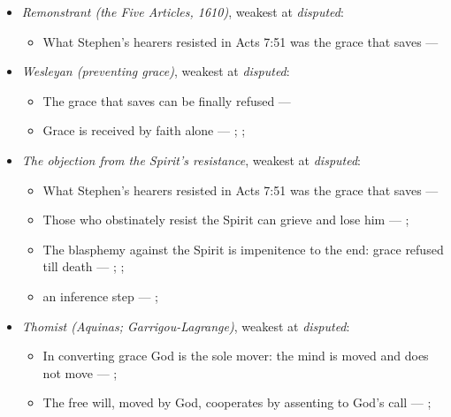 \documentclass[11pt]{article}
\begin{document}
\begin{itemize}
\begin{itemize}
\end{itemize}
\item \emph{Remonstrant (the Five Articles, 1610)}, weakest at \emph{disputed}:
\begin{itemize}
\item What Stephen’s hearers resisted in Acts 7:51 was the grace that saves --- \cite[Five Arminian Articles (1610), art. 4]{schaff-creeds-christendom-3-1977}
\end{itemize}
\item \emph{Wesleyan (preventing grace)}, weakest at \emph{disputed}:
\begin{itemize}
\item The grace that saves can be finally refused --- \cite[397]{wesley-works-9-1827}
\item Grace is received by faith alone --- \cite[Augsburg Confession IV.1–3]{concordia-triglotta-1921}; \cite[Sermon 1, III.1]{wesley-sermons-1872}; \cite[Trent, Session VI (1547), canon 9]{tanner-decrees-1990}
\end{itemize}
\item \emph{The objection from the Spirit’s resistance}, weakest at \emph{disputed}:
\begin{itemize}
\item What Stephen’s hearers resisted in Acts 7:51 was the grace that saves --- \cite[Five Arminian Articles (1610), art. 4]{schaff-creeds-christendom-3-1977}
\item Those who obstinately resist the Spirit can grieve and lose him --- \cite[Solid Declaration II.83]{concordia-triglotta-1921}; \cite[Solid Declaration XI.42]{concordia-triglotta-1921}
\item The blasphemy against the Spirit is impenitence to the end: grace refused till death --- \cite[325]{npnf1-06-1888}; \cite[II-II q.14 a.1]{aquinas-summa-1920}; \cite[74]{calvin-harmony-evangelists-2-1845}
\item an inference step --- \cite[325]{npnf1-06-1888}; \cite[On Rebuke and Grace, ch. 43]{npnf1-05-1887}
\end{itemize}
\item \emph{Thomist (Aquinas; Garrigou-Lagrange)}, weakest at \emph{disputed}:
\begin{itemize}
\item In converting grace God is the sole mover: the mind is moved and does not move --- \cite[I-II q.111 a.2]{aquinas-summa-1920}; \cite[ch. IV]{garrigou-lagrange-grace-1952}
\item The free will, moved by God, cooperates by assenting to God’s call --- \cite[Trent, Session VI (1547), canon 4]{tanner-decrees-1990}; \cite[45]{waterworth-trent-1848}

\end{itemize}
\end{itemize}
\end{document}
